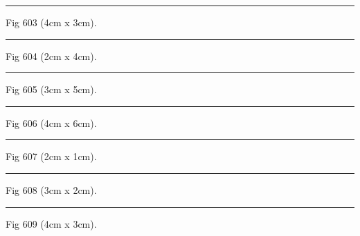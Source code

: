 \documentclass[a4paper,11pt]{article}
\begin{document}
\begin{swarmwrap}%
  \begin{minipage}[t]{4cm}
    \centering
    \rule{\linewidth}{3cm}
    {\footnotesize Fig 603 (4cm x 3cm).}
  \end{minipage}%
\end{swarmwrap}%
\swarmwrapnext
\lipsum[3]%

\begin{swarmwrap}%
  \begin{minipage}[t]{2cm}
    \centering
    \rule{\linewidth}{4cm}
    {\footnotesize Fig 604 (2cm x 4cm).}
  \end{minipage}%
\end{swarmwrap}%
\swarmwrapnext
\lipsum[4]%

\begin{swarmwrap}%
  \begin{minipage}[t]{3cm}
    \centering
    \rule{\linewidth}{5cm}
    {\footnotesize Fig 605 (3cm x 5cm).}
  \end{minipage}%
\end{swarmwrap}%
\swarmwrapnext
\lipsum[5]%

\begin{swarmwrap}%
  \begin{minipage}[t]{4cm}
    \centering
    \rule{\linewidth}{6cm}
    {\footnotesize Fig 606 (4cm x 6cm).}
  \end{minipage}%
\end{swarmwrap}%
\swarmwrapnext
\lipsum[6]%

\begin{swarmwrap}%
  \begin{minipage}[t]{2cm}
    \centering
    \rule{\linewidth}{1cm}
    {\footnotesize Fig 607 (2cm x 1cm).}
  \end{minipage}%
\end{swarmwrap}%
\swarmwrapnext
\lipsum[7]%

\begin{swarmwrap}%
  \begin{minipage}[t]{3cm}
    \centering
    \rule{\linewidth}{2cm}
    {\footnotesize Fig 608 (3cm x 2cm).}
  \end{minipage}%
\end{swarmwrap}%
\swarmwrapnext
\lipsum[8]%

\begin{swarmwrap}%
  \begin{minipage}[t]{4cm}
    \centering
    \rule{\linewidth}{3cm}
    {\footnotesize Fig 609 (4cm x 3cm).}
  \end{minipage}%
\end{swarmwrap}%
\swarmwrapnext
\lipsum[9]%
\end{document}
